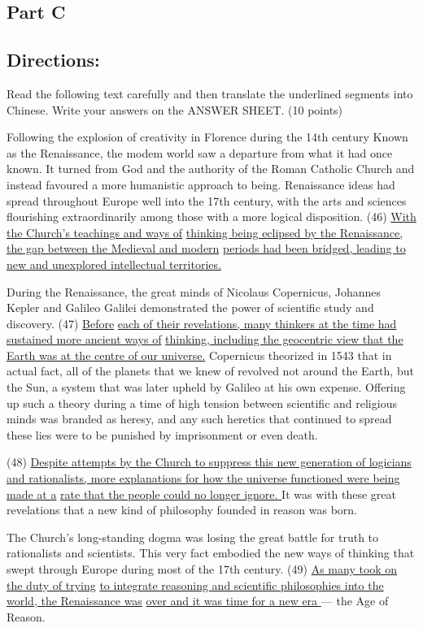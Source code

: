 \documentclass[UTF8,11pt]{ctexart}
\begin{document}
\subsection*{\textbf{Part C}}


\subsection*{\textbf{Directions:}}


Read the following text carefully and then translate the underlined segments into Chinese. Write your answers on the ANSWER SHEET. (10 points)


Following the explosion of creativity in Florence during the 14th century Known as the Renaissance, the modem world saw a departure from what it had once known. It turned from God and the authority of the Roman Catholic Church and instead favoured a more humanistic approach to being. Renaissance ideas had spread throughout Europe well into the 17th century, with the arts and sciences flourishing extraordinarily among those with a more logical disposition. (46) \uline{With the Church’s teachings and ways of} \uline{thinking being eclipsed by the Renaissance, the gap between the Medieval and modern} \uline{periods had been bridged, leading to new and unexplored intellectual territories.}


During the Renaissance, the great minds of Nicolaus Copernicus, Johannes Kepler and Galileo Galilei demonstrated the power of scientific study and discovery. (47) \uline{Before} \uline{each of their revelations, many thinkers at the time had sustained more ancient ways of} \uline{thinking, including the geocentric view that the Earth was at the centre of our universe.} Copernicus theorized in 1543 that in actual fact, all of the planets that we knew of revolved not around the Earth, but the Sun, a system that was later upheld by Galileo at his own expense. Offering up such a theory during a time of high tension between scientific and religious minds was branded as heresy, and any such heretics that continued to spread these lies were to be punished by imprisonment or even death.


(48) \uline{Despite attempts by the Church to suppress this new generation of logicians} \uline{and rationalists, more explanations for how the universe functioned were being made at a} \uline{rate that the people could no longer ignore. }It was with these great revelations that a new kind of philosophy founded in reason was born.


The Church’s long-standing dogma was losing the great battle for truth to rationalists and scientists. This very fact embodied the new ways of thinking that swept through Europe during most of the 17th century. (49) \uline{As many took on the duty of trying} \uline{to integrate reasoning and scientific philosophies into the world, the Renaissance was} \uline{over and it was time for a new era }— the Age of Reason.
\end{document}
